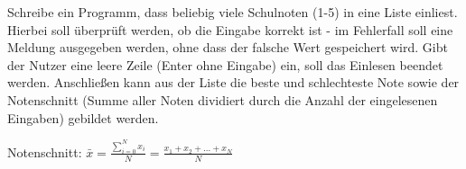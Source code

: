 
Schreibe ein Programm, dass beliebig viele Schulnoten (1-5) in eine Liste
einliest. Hierbei soll überprüft werden, ob die Eingabe korrekt ist - im
Fehlerfall soll eine Meldung ausgegeben werden, ohne dass der falsche Wert
gespeichert wird. Gibt der Nutzer eine leere Zeile (Enter
ohne Eingabe) ein, soll das Einlesen beendet werden. Anschließen kann aus
der Liste die beste und schlechteste Note sowie der Notenschnitt (Summe
aller Noten dividiert durch die Anzahl der eingelesenen Eingaben)
gebildet werden.

Notenschnitt: $\bar{x} = \frac{\sum_{i=0}^ {N} x_i}{N}=\frac{x_1+x_2+\ldots+x_N}{N}$
